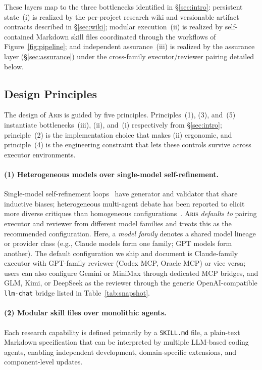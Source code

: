 \documentclass{article}
\newcommand{\aris}{\textsc{Aris}}
\newcommand{\skillmd}{\texttt{SKILL.md}}
\theoremstyle{remark}
\begin{document}
These layers map to the three bottlenecks identified in \S\ref{sec:intro}: persistent state~(i) is realized by the per-project research wiki and versionable artifact contracts described in \S\ref{sec:wiki}; modular execution~(ii) is realized by self-contained Markdown skill files coordinated through the workflows of Figure~\ref{fig:pipeline}; and independent assurance~(iii) is realized by the assurance layer (\S\ref{sec:assurance}) under the cross-family executor/reviewer pairing detailed below.

\subsection{Design Principles}

The design of \aris{} is guided by five principles.
Principles~(1), (3), and~(5) instantiate bottlenecks~(iii), (ii), and~(i) respectively from \S\ref{sec:intro}; principle~(2) is the implementation choice that makes (ii) ergonomic, and principle~(4) is the engineering constraint that lets these controls survive across executor environments.

\paragraph{(1) Heterogeneous models over single-model self-refinement.}
Single-model self-refinement loops~\citep{madaan2023selfrefine,shinn2023reflexion} have generator and validator that share inductive biases; heterogeneous multi-agent debate has been reported to elicit more diverse critiques than homogeneous configurations~\citep{liang2024divergent,du2024multiagentdebate}.
\aris{} \emph{defaults to} pairing executor and reviewer from different model families and treats this as the recommended configuration.
Here, a \emph{model family} denotes a shared model lineage or provider class (e.g., Claude models form one family; GPT models form another).
The default configuration we ship and document is Claude-family executor with GPT-family reviewer (Codex MCP, Oracle MCP) or vice versa; users can also configure Gemini or MiniMax through dedicated MCP bridges, and GLM, Kimi, or DeepSeek as the reviewer through the generic OpenAI-compatible \texttt{llm-chat} bridge listed in Table~\ref{tab:snapshot}.


\paragraph{(2) Modular skill files over monolithic agents.}
Each research capability is defined primarily by a \skillmd{} file, a plain-text Markdown specification that can be interpreted by multiple LLM-based coding agents, enabling independent development, domain-specific extensions, and component-level updates.
\end{document}
